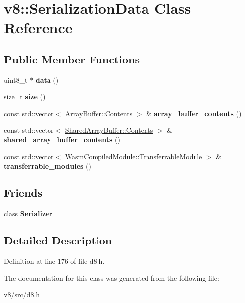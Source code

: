 \hypertarget{classv8_1_1SerializationData}{}\section{v8\+:\+:Serialization\+Data Class Reference}
\label{classv8_1_1SerializationData}
\subsection*{Public Member Functions}
\begin{DoxyCompactItemize}
\item 
\mbox{\label{classv8_1_1SerializationData_af77ac4b2a2037792ce89cddcc886f537}} 
uint8\+\_\+t $\ast$ {\bfseries data} ()
\item 
\mbox{\label{classv8_1_1SerializationData_a46580554c0f1c21f4454f13d854dc30a}} 
\mbox{\hyperlink{classsize__t}{size\+\_\+t}} {\bfseries size} ()
\item 
\mbox{\label{classv8_1_1SerializationData_a36feaa76b2923c28682de814f16c60b8}} 
const std\+::vector$<$ \mbox{\hyperlink{classv8_1_1ArrayBuffer_1_1Contents}{Array\+Buffer\+::\+Contents}} $>$ \& {\bfseries array\+\_\+buffer\+\_\+contents} ()
\item 
\mbox{\label{classv8_1_1SerializationData_a06c1ff32445ef0effae1bc77749e094f}} 
const std\+::vector$<$ \mbox{\hyperlink{classv8_1_1SharedArrayBuffer_1_1Contents}{Shared\+Array\+Buffer\+::\+Contents}} $>$ \& {\bfseries shared\+\_\+array\+\_\+buffer\+\_\+contents} ()
\item 
\mbox{\label{classv8_1_1SerializationData_a151f2350cb4fdfa64e4f6af2f83de06e}} 
const std\+::vector$<$ \mbox{\hyperlink{classv8_1_1WasmCompiledModule_1_1TransferrableModule}{Wasm\+Compiled\+Module\+::\+Transferrable\+Module}} $>$ \& {\bfseries transferrable\+\_\+modules} ()
\end{DoxyCompactItemize}
\subsection*{Friends}
\begin{DoxyCompactItemize}
\item 
\mbox{\label{classv8_1_1SerializationData_ad3f5346f31d572dd2ab4fcd658de5bc4}} 
class {\bfseries Serializer}
\end{DoxyCompactItemize}


\subsection{Detailed Description}


Definition at line 176 of file d8.\+h.



The documentation for this class was generated from the following file\+:\begin{DoxyCompactItemize}
\item 
v8/src/d8.\+h\end{DoxyCompactItemize}

